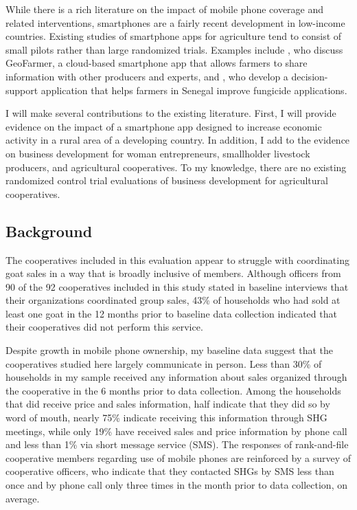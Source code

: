 \documentclass[11pt]{article}
\begin{document}
While there is a rich literature on the impact of mobile phone coverage and related interventions, smartphones are a fairly recent development in low-income countries. Existing studies of smartphone apps for agriculture tend to consist of small pilots rather than large randomized trials. Examples include \citet{eitzinger-et.al.19}, who discuss GeoFarmer, a cloud-based smartphone app that allows farmers to share information with other producers and experts, and \citet{saito-et.al.15}, who develop a decision-support application that helps farmers in Senegal improve fungicide applications. %

I will make several contributions to the existing literature. First, I will provide evidence on the impact of a smartphone app designed to increase economic activity in a rural area of a developing country. In addition, I add to the evidence on business development for woman entrepreneurs, smallholder livestock producers, and agricultural cooperatives. To my knowledge, there are no existing randomized control trial evaluations of business development for agricultural cooperatives. 

\subsection{Background} \label{sec:E3_background}

The cooperatives included in this evaluation appear to struggle with coordinating goat sales in a way that is broadly inclusive of members. Although officers from 90 of the 92 cooperatives included in this study stated in baseline interviews that their organizations coordinated group sales, 43\% of households who had sold at least one goat in the 12 months prior to baseline data collection indicated that their cooperatives did not perform this service. 

Despite growth in mobile phone ownership, my baseline data suggest that the cooperatives studied here largely communicate in person. Less than 30\% of households in my sample received any information about sales organized through the cooperative in the 6 months prior to data collection. Among the households that did receive price and sales information, half indicate that they did so by word of mouth, nearly 75\% indicate receiving this information through SHG meetings, while only 19\% have received sales and price information by phone call and less than 1\% via short message service (SMS). The responses of rank-and-file cooperative members regarding use of mobile phones are reinforced by a survey of cooperative officers, who indicate that they contacted SHGs by SMS less than once and by phone call only three times in the month prior to data collection, on average. 
\end{document}

